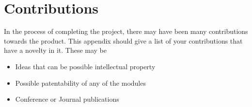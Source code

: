 
\chapter{Contributions}

In the process of completing the project, there may have been many
contributions towards the product. This appendix should give a list
of your contributions that have a novelty in it. These may be
\begin{itemize}
\item Ideas that can be possible intellectual property
\item Possible patentability of any of the modules
\item Conference or Journal publications
\end{itemize}

